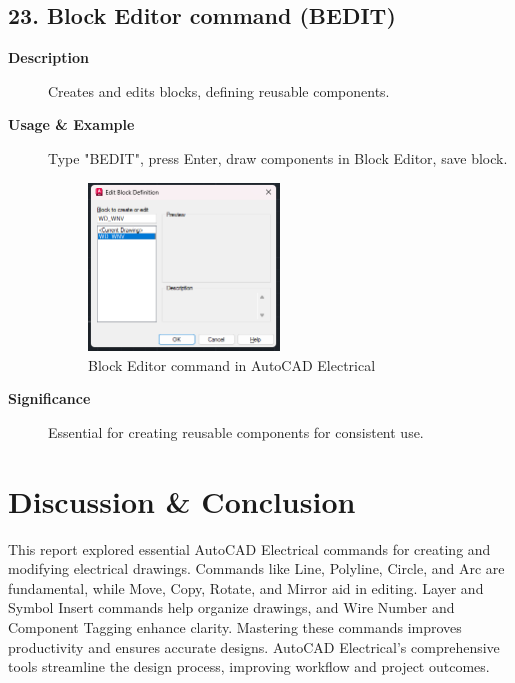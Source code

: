 \documentclass[12pt]{article}
\begin{document}
\subsection*{23. Block Editor command (BEDIT)}
\begin{description}
    \item [\textbf{Description}] Creates and edits blocks, defining reusable components.
    \item [\textbf{Usage \& Example}] Type "BEDIT", press Enter, draw components in Block Editor, save block.
          \begin{figure}[H]
              \centering
              \includegraphics[width=0.5\textwidth]{block_editor_command.png}
              \caption{Block Editor command in AutoCAD Electrical}
          \end{figure}
    \item [\textbf{Significance}] Essential for creating reusable components for consistent use.
\end{description}

\section*{Discussion \& Conclusion}
This report explored essential AutoCAD Electrical commands for creating and modifying electrical drawings. Commands like Line, Polyline, Circle, and Arc are fundamental, while Move, Copy, Rotate, and Mirror aid in editing. Layer and Symbol Insert commands help organize drawings, and Wire Number and Component Tagging enhance clarity. Mastering these commands improves productivity and ensures accurate designs. AutoCAD Electrical's comprehensive tools streamline the design process, improving workflow and project outcomes.

% 
% 
\end{document}
